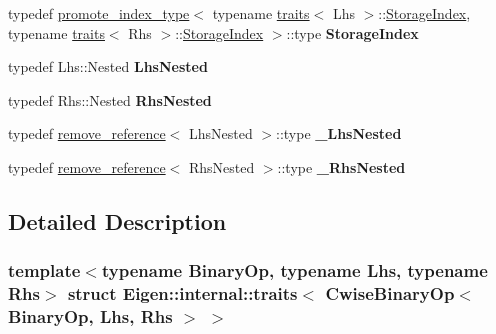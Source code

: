 \begin{DoxyCompactItemize}
typedef \hyperlink{struct_eigen_1_1internal_1_1promote__index__type}{promote\+\_\+index\+\_\+type}$<$ typename \hyperlink{struct_eigen_1_1internal_1_1traits}{traits}$<$ Lhs $>$\+::\hyperlink{struct_eigen_1_1internal_1_1conditional}{Storage\+Index}, typename \hyperlink{struct_eigen_1_1internal_1_1traits}{traits}$<$ Rhs $>$\+::\hyperlink{struct_eigen_1_1internal_1_1conditional}{Storage\+Index} $>$\+::type {\bfseries Storage\+Index}
\item 
\mbox{\label{struct_eigen_1_1internal_1_1traits_3_01_cwise_binary_op_3_01_binary_op_00_01_lhs_00_01_rhs_01_4_01_4_a8fed753b3298010bd51e25bbae71c435}} 
typedef Lhs\+::\+Nested {\bfseries Lhs\+Nested}
\item 
\mbox{\label{struct_eigen_1_1internal_1_1traits_3_01_cwise_binary_op_3_01_binary_op_00_01_lhs_00_01_rhs_01_4_01_4_a59de2b2b29033b7cfab53e1f5b52718c}} 
typedef Rhs\+::\+Nested {\bfseries Rhs\+Nested}
\item 
\mbox{\label{struct_eigen_1_1internal_1_1traits_3_01_cwise_binary_op_3_01_binary_op_00_01_lhs_00_01_rhs_01_4_01_4_ae328452c3cfd91628ea98b98414e0b2a}} 
typedef \hyperlink{struct_eigen_1_1internal_1_1remove__reference}{remove\+\_\+reference}$<$ Lhs\+Nested $>$\+::type {\bfseries \+\_\+\+Lhs\+Nested}
\item 
\mbox{\label{struct_eigen_1_1internal_1_1traits_3_01_cwise_binary_op_3_01_binary_op_00_01_lhs_00_01_rhs_01_4_01_4_a84219d0382f4733aef9a89ae5929772a}} 
typedef \hyperlink{struct_eigen_1_1internal_1_1remove__reference}{remove\+\_\+reference}$<$ Rhs\+Nested $>$\+::type {\bfseries \+\_\+\+Rhs\+Nested}
\end{DoxyCompactItemize}


\subsection{Detailed Description}
\subsubsection*{template$<$typename Binary\+Op, typename Lhs, typename Rhs$>$\newline
struct Eigen\+::internal\+::traits$<$ Cwise\+Binary\+Op$<$ Binary\+Op, Lhs, Rhs $>$ $>$}



